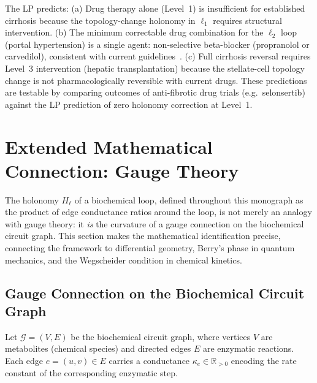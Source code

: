 \begin{prediction}[Cirrhosis]
\label{pred:ch11-cirrhosis}
The LP predicts: (a) Drug therapy alone (Level~1) is insufficient for
established cirrhosis because the topology-change holonomy in $\ell_1$ requires
structural intervention.  (b) The minimum correctable drug combination for the
$\ell_2$ loop (portal hypertension) is a single agent: non-selective beta-blocker
(propranolol or carvedilol), consistent with current guidelines~\citep{deFranchis2015}.
(c) Full cirrhosis reversal requires Level~3 intervention (hepatic transplantation)
because the stellate-cell topology change is not pharmacologically reversible with
current drugs.  These predictions are testable by comparing outcomes of
anti-fibrotic drug trials (e.g.\ selonsertib) against the LP prediction of
zero holonomy correction at Level~1.
\end{prediction}

\section{Extended Mathematical Connection: Gauge Theory}
\label{sec:ch11-gauge}

The holonomy $H_\ell$ of a biochemical loop, defined throughout this monograph
as the product of edge conductance ratios around the loop, is not merely an
analogy with gauge theory: it \emph{is} the curvature of a gauge connection
on the biochemical circuit graph.  This section makes the mathematical
identification precise, connecting the framework to differential geometry,
Berry's phase in quantum mechanics, and the Wegscheider condition in chemical
kinetics.

\subsection{Gauge Connection on the Biochemical Circuit Graph}
\label{subsec:ch11-gauge-connection}

Let $\mathcal{G} = (V, E)$ be the biochemical circuit graph, where vertices
$V$ are metabolites (chemical species) and directed edges $E$ are enzymatic
reactions.  Each edge $e = (u,v) \in E$ carries a conductance
$\kappa_e \in \mathbb{R}_{>0}$ encoding the rate constant of the corresponding
enzymatic step.

